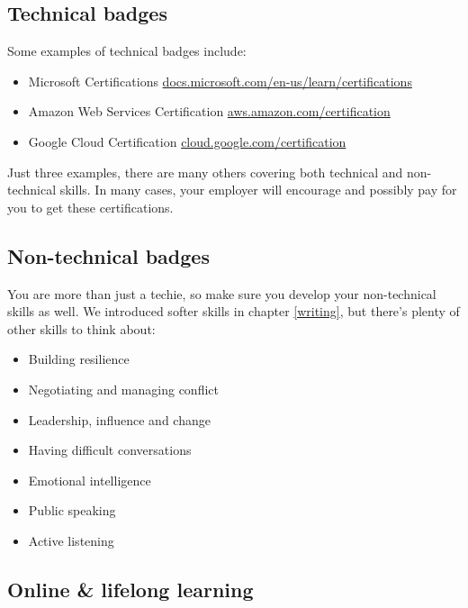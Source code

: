 \documentclass[
]{book}
\providecommand{\tightlist}{%
  \setlength{\itemsep}{0pt}\setlength{\parskip}{0pt}}
\begin{document}
\hypertarget{techie}{%
\subsection{Technical badges}\label{techie}}

Some examples of technical badges include:

\begin{itemize}
\tightlist
\item
  Microsoft Certifications \href{https://docs.microsoft.com/en-us/learn/certifications/}{docs.microsoft.com/en-us/learn/certifications}
\item
  Amazon Web Services Certification \href{https://aws.amazon.com/certification/}{aws.amazon.com/certification}
\item
  Google Cloud Certification \href{https://cloud.google.com/certification}{cloud.google.com/certification}
\end{itemize}

Just three examples, there are many others covering both technical and non-technical skills. In many cases, your employer will encourage and possibly pay for you to get these certifications.

\hypertarget{techieplusplus}{%
\subsection{Non-technical badges}\label{techieplusplus}}

You are more than just a techie, so make sure you develop your non-technical skills as well. We introduced softer skills in chapter \ref{writing}, but there's plenty of other skills to think about:

\begin{itemize}
\tightlist
\item
  Building resilience
\item
  Negotiating and managing conflict
\item
  Leadership, influence and change
\item
  Having difficult conversations
\item
  Emotional intelligence
\item
  Public speaking
\item
  Active listening
\end{itemize}

\hypertarget{mooc}{%
\subsection{Online \& lifelong learning}\label{mooc}}
\end{document}

